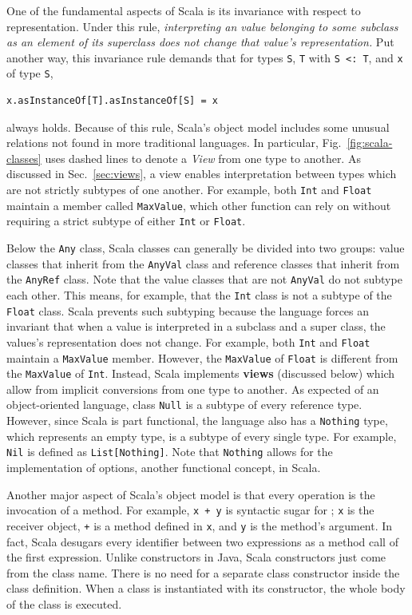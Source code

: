 \documentclass[jou,apacite]{IEEEtran}
\begin{document}
One of the fundamental aspects of Scala is its invariance with respect to
representation. Under this rule, \emph{interpreting an value belonging to some
  subclass as an element of its superclass does not change that value's
  representation.} Put another way, this invariance rule demands that for types
\texttt{S}, \texttt{T} with \texttt{S~<:~T}, and \texttt{x} of type \texttt{S},
\begin{verbatim}
x.asInstanceOf[T].asInstanceOf[S] = x
\end{verbatim}
always holds. Because of this rule, Scala's object model includes some unusual
relations not found in more traditional languages. In particular,
Fig.~\ref{fig:scala-classes} uses dashed lines to denote a \emph{View} from one
type to another. As discussed in Sec.~\ref{sec:views}, a view enables
interpretation between types which are not strictly subtypes of one
another. For example, both \texttt{Int} and \texttt{Float} maintain a member
called \texttt{MaxValue}, which other function can rely on without requiring
a strict subtype of either \texttt{Int} or \texttt{Float}.

Below the \texttt{Any} class, Scala classes can generally be
divided into two groups: value classes that inherit from the \texttt{AnyVal}
class and reference classes that inherit from the \texttt{AnyRef} class. Note
that the value classes that are not \texttt{AnyVal} do not subtype each
other. This means, for example, that the \texttt{Int} class is not a subtype of
the \texttt{Float} class. Scala prevents such subtyping because the language
forces an invariant that when a value is interpreted in a subclass and a super
class, the values's representation does not change. For example, both
\texttt{Int} and \texttt{Float} maintain a \texttt{MaxValue} member. However,
the \texttt{MaxValue} of \texttt{Float} is different from the \texttt{MaxValue}
of \texttt{Int}. Instead, Scala implements \textbf{views} (discussed below)
which allow from implicit conversions from one type to another. As expected of
an object-oriented language, class \texttt{Null} is a subtype of every reference
type. However, since Scala is part functional, the language also has a
\texttt{Nothing} type, which represents an empty type, is a subtype of every
single type. For example, \texttt{Nil} is defined as
\texttt{List[Nothing]}. Note that \texttt{Nothing} allows for the implementation
of options, another functional concept, in Scala.

Another major aspect of Scala's object model is that every operation is the
invocation of a method. For example, \texttt{x + y} is syntactic sugar for
; \texttt{x} is the receiver object, \texttt{+} is a method defined
in \texttt{x}, and \texttt{y} is the method's argument. In fact, Scala desugars
every identifier between two expressions as a method call of the first
expression. Unlike constructors in Java, Scala constructors just come from the
class name. There is no need for a separate class constructor inside the class
definition. When a class is instantiated with its constructor, the whole body of
the class is executed.
\end{document}
